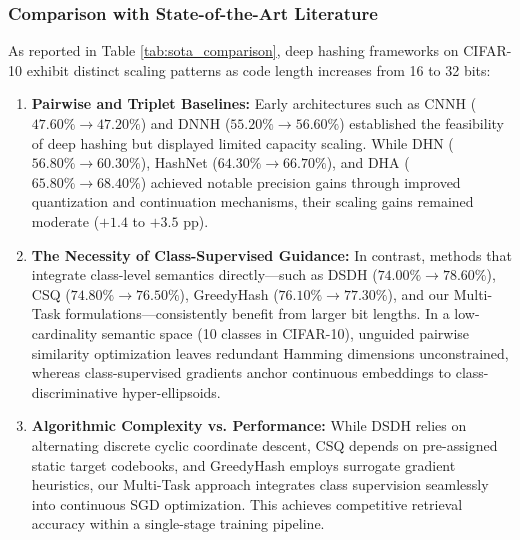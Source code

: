 \documentclass[10pt,conference]{IEEEtran}
\begin{document}
\subsubsection{Comparison with State-of-the-Art Literature}
As reported in Table \ref{tab:sota_comparison}, deep hashing frameworks on CIFAR-10 exhibit distinct scaling patterns as code length increases from 16 to 32 bits:
\begin{enumerate}
    \item \textbf{Pairwise and Triplet Baselines:} Early architectures such as CNNH ($47.60\% \to 47.20\%$) and DNNH ($55.20\% \to 56.60\%$) established the feasibility of deep hashing but displayed limited capacity scaling. While DHN ($56.80\% \to 60.30\%$), HashNet ($64.30\% \to 66.70\%$), and DHA ($65.80\% \to 68.40\%$) achieved notable precision gains through improved quantization and continuation mechanisms, their scaling gains remained moderate ($+1.4$ to $+3.5$ pp).
    \item \textbf{The Necessity of Class-Supervised Guidance:} In contrast, methods that integrate class-level semantics directly—such as DSDH ($74.00\% \to 78.60\%$), CSQ ($74.80\% \to 76.50\%$), GreedyHash ($76.10\% \to 77.30\%$), and our Multi-Task formulations—consistently benefit from larger bit lengths. In a low-cardinality semantic space (10 classes in CIFAR-10), unguided pairwise similarity optimization leaves redundant Hamming dimensions unconstrained, whereas class-supervised gradients anchor continuous embeddings to class-discriminative hyper-ellipsoids.
    \item \textbf{Algorithmic Complexity vs. Performance:} While DSDH relies on alternating discrete cyclic coordinate descent, CSQ depends on pre-assigned static target codebooks, and GreedyHash employs surrogate gradient heuristics, our Multi-Task approach integrates class supervision seamlessly into continuous SGD optimization. This achieves competitive retrieval accuracy within a single-stage training pipeline.
\end{enumerate}
\end{document}
